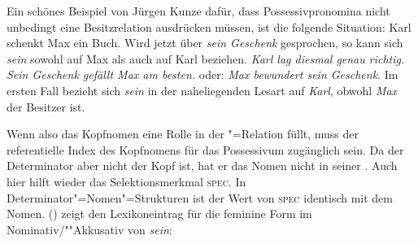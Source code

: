 Ein schönes Beispiel von Jürgen Kunze dafür, 
dass Possessivpronomina nicht unbedingt eine Besitzrelation ausdrücken müssen,
ist die folgende Situation: Karl schenkt Max ein Buch.
Wird jetzt über \emph{sein Geschenk} gesprochen, so kann sich \emph{sein} sowohl auf
Max als auch auf Karl beziehen. \emph{Karl lag diesmal genau richtig. Sein Geschenk
gefällt Max am besten.} oder: \emph{Max bewundert sein Geschenk}.
Im ersten Fall bezieht sich \emph{sein} in der naheliegenden Lesart
auf \emph{Karl}, obwohl \emph{Max} der Besitzer ist.

Wenn also das Kopfnomen eine Rolle in der "=Relation füllt, muss der
referentielle Index des Kopfnomens für das Possessivum zugänglich sein. Da der Determinator
aber nicht der Kopf ist, hat er das Nomen nicht in seiner \compsl. Auch hier hilft
wieder das Selektionsmerkmal \textsc{spec}. In Determinator"=Nomen"=Strukturen
ist der Wert von \textsc{spec} identisch mit dem Nomen. () zeigt den Lexikoneintrag
für die feminine Form im Nominativ/""Akkusativ von \emph{sein}:

